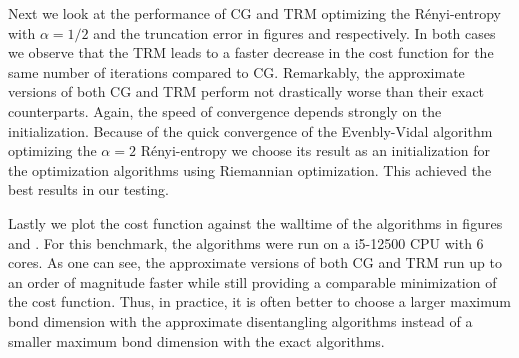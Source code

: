 Next we look at the performance of CG and TRM optimizing the Rényi-entropy with $\alpha = 1/2$ and the truncation error in figures  and  respectively. In both cases we observe that the TRM leads to a faster decrease in the cost function for the same number of iterations compared to CG. Remarkably, the approximate versions of both CG and TRM perform not drastically worse than their exact counterparts. Again, the speed of convergence depends strongly on the initialization. Because of the quick convergence of the Evenbly-Vidal algorithm optimizing the $\alpha = 2$ Rényi-entropy we choose its result as an initialization for the optimization algorithms using Riemannian optimization. This achieved the best results in our testing. \par
Lastly we plot the cost function against the walltime of the algorithms in figures  and . For this benchmark, the algorithms were run on a i5-12500 CPU with 6 cores. As one can see, the approximate versions of both CG and TRM run up to an order of magnitude faster while still providing a comparable minimization of the cost function. Thus, in practice, it is often better to choose a larger maximum bond dimension with the approximate disentangling algorithms instead of a smaller maximum bond dimension with the exact algorithms.
